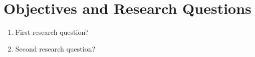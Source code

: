 \section{Objectives and Research Questions}
\label{sec:objectives}


\begin{enumerate}[label=\textbf{RQ\arabic*}]
  \item First research question?
  \item Second research question?
\end{enumerate}
